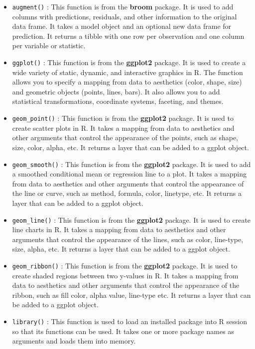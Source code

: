 \documentclass[
]{book}
\begin{document}
\begin{itemize}
\item
  \texttt{augment()} : This function is from the \textbf{broom} package. It is used to add columns with predictions, residuals, and other information to the original data frame. It takes a model object and an optional new data frame for prediction. It returns a tibble with one row per observation and one column per variable or statistic.
\item
  \texttt{ggplot()} : This function is from the \textbf{ggplot2} package. It is used to create a wide variety of static, dynamic, and interactive graphics in R. The function allows you to specify a mapping from data to aesthetics (color, shape, size) and geometric objects (points, lines, bars). It also allows you to add statistical transformations, coordinate systems, faceting, and themes.
\item
  \texttt{geom\_point()} : This function is from the \textbf{ggplot2} package. It is used to create scatter plots in R. It takes a mapping from data to aesthetics and other arguments that control the appearance of the points, such as shape, size, color, alpha, etc. It returns a layer that can be added to a ggplot object.
\item
  \texttt{geom\_smooth()} : This function is from the \textbf{ggplot2} package. It is used to add a smoothed conditional mean or regression line to a plot. It takes a mapping from data to aesthetics and other arguments that control the appearance of the line or curve, such as method, formula, color, linetype, etc. It returns a layer that can be added to a ggplot object.
\item
  \texttt{geom\_line()} : This function is from the \textbf{ggplot2} package. It is used to create line charts in R. It takes a mapping from data to aesthetics and other arguments that control the appearance of the lines, such as color, line-type, size, alpha, etc. It returns a layer that can be added to a ggplot object.
\item
  \texttt{geom\_ribbon()} : This function is from the \textbf{ggplot2} package. It is used to create shaded regions between two y-values in R. It takes a mapping from data to aesthetics and other arguments that control the appearance of the ribbon, such as fill color, alpha value, line-type etc. It returns a layer that can be added to a ggplot object.
\item
  \texttt{library()} : This function is used to load an installed package into R session so that its functions can be used. It takes one or more package names as arguments and loads them into memory.
\end{itemize}
\end{document}
